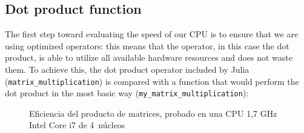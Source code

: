 \subsection{Dot product function}
The first step toward evaluating the speed of our CPU is to ensure that we are using optimized operators: this means that the 
operator, in this case the dot product, is able to utilize all available hardware resources and does not waste them. To achieve 
this, the dot product operator included by Julia (\texttt{matrix\_multiplication}) is compared with a function that would perform the dot 
product in the most basic way (\texttt{my\_matrix\_multiplication}):

\vspace*{0.5cm}



\vspace*{1cm}

\begin{figure}[h]
    \begin{center}
        
   \end{center}
   \caption{Eficiencia del producto de matrices, probado en una CPU 1,7 GHz Intel Core i7 de 4 núcleos}
   \label{}
\end{figure}



\clearpage
\newpage